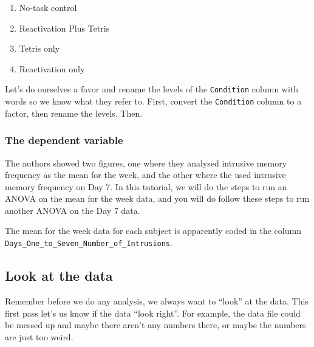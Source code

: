 \documentclass[]{book}
\newenvironment{Shaded}{\begin{snugshade}}{\end{snugshade}}
\newcommand{\KeywordTok}[1]{\textcolor[rgb]{0.13,0.29,0.53}{\textbf{{#1}}}}
\newcommand{\StringTok}[1]{\textcolor[rgb]{0.31,0.60,0.02}{{#1}}}
\newcommand{\NormalTok}[1]{{#1}}
\providecommand{\tightlist}{%
  \setlength{\itemsep}{0pt}\setlength{\parskip}{0pt}}
\theoremstyle{definition}
\theoremstyle{definition}
\theoremstyle{definition}
\theoremstyle{remark}
\begin{document}
\begin{enumerate}
\def\labelenumi{\arabic{enumi}.}
\tightlist
\item
  No-task control
\item
  Reactivation Plus Tetris
\item
  Tetris only
\item
  Reactivation only
\end{enumerate}

Let's do ourselves a favor and rename the levels of the
\texttt{Condition} column with words so we know what they refer to.
First, convert the \texttt{Condition} column to a factor, then rename
the levels. Then.

\begin{Shaded}
\end{Shaded}

\subsubsection{The dependent variable}\label{the-dependent-variable}

The authors showed two figures, one where they analysed intrusive memory
frequency as the mean for the week, and the other where the used
intrusive memory frequency on Day 7. In this tutorial, we will do the
steps to run an ANOVA on the mean for the week data, and you will do
follow these steps to run another ANOVA on the Day 7 data.

The mean for the week data for each subject is apparently coded in the
column \texttt{Days\_One\_to\_Seven\_Number\_of\_Intrusions}.

\subsection{Look at the data}\label{look-at-the-data-1}

Remember before we do any analysis, we always want to ``look'' at the
data. This first pass let's us know if the data ``look right''. For
example, the data file could be messed up and maybe there aren't any
numbers there, or maybe the numbers are just too weird.
\end{document}
